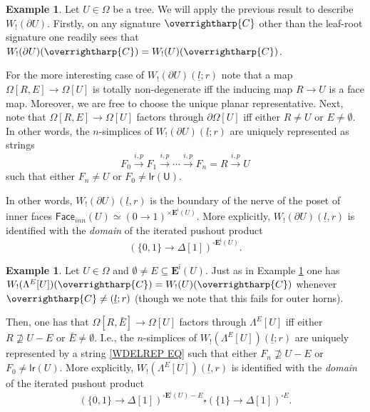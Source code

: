 \documentclass[a4paper,10pt
,draft
]{article}%
\numberwithin{equation}{section}
\numberwithin{figure}{section}
\theoremstyle{definition} %
\newtheorem{example}[equation]{Example}%
\newcommand{\vect}[1]{\text{\overrightharp{\ensuremath{#1}}}}
\newcommand{\1}{\ensuremath{\mathbbm 1}}%
\begin{document}
\begin{example}\label{WPARTIALT_EX}
	Let $U \in \Omega$ be a tree.
	We will apply the previous result to describe
	$W_!(\partial U)$.
	Firstly, 
	on any signature $\vect{C}$
	other than the leaf-root signature
	one readily sees that
	$W_!(\partial U)(\vect{C}) = W_!(U)(\vect{C})$.
	
	For the more interesting case of 
	$W_!(\partial U)(\underline{l};r)$
	note that a map
	$\Omega[R,E] \to \Omega [U]$
	is totally non-degenerate iff
	the inducing map $R \to U$
	is a face map. Moreover, we are free to choose the unique planar representative.
	Next, note that 
	$\Omega[R,E] \to \Omega [U]$
	factors through $\partial \Omega[U]$
	iff either $R \neq U$ or $E \neq \emptyset$.
	In other words, the $n$-simplices of 
	$W_!(\partial U)(\underline{l};r)$
	are uniquely represented as strings
	\begin{equation}\label{WDELREP EQ}
	F_0 \xrightarrow{i,p} 
	F_1 \xrightarrow{i,p} 
	\cdots \xrightarrow{i,p}
	F_n = R \xrightarrow{i,p} U
	\end{equation}
	such that either $F_n \neq U$ or $F_0 \neq \mathsf{lr(U)}$.
	
	In other words, 
	$W_!(\partial U)(\underline{l},r)$
	is the boundary of the nerve of the poset of inner faces
	$\mathsf{Face}_{inn}(U) \simeq 
	(0 \to 1)^{\times \boldsymbol{E}^{\mathsf{i}}(U)}$.
	More explicitly, 
	$W_!(\partial U)(\underline{l},r)$ 
	is identified with the \emph{domain} of the iterated pushout product
	\[
	\left(
	\{0,1\} \to \Delta[1]
	\right)^{\square \boldsymbol{E}^{\mathsf{i}}(U)}.
	\]
\end{example}




\begin{example}\label{WPARTIALT2_EX}
	Let $U\in \Omega$ and 
	$\emptyset \neq E \subseteq \boldsymbol{E}^{\mathsf{i}}(U)$.
	Just as in Example \ref{WPARTIALT_EX}
	one has 
	$W_!(\Lambda^E[U])(\vect{C}) = W_!(U)(\vect{C})$
	whenever $\vect{C} \neq (\underline{l};r)$
	(though we note that this fails for outer horns).
	
	Then, one has that 
	$\Omega[R,\bar{E}] \to \Omega[U]$
	factors through $\Lambda^E[U]$
	iff either $R \not \supseteq U-E$ or $\bar{E}\neq \emptyset$.
	I.e., the $n$-simplices of
	$W_!(\Lambda^E[U])(\underline{l};r)$ 
	are uniquely represented by a string
	\eqref{WDELREP EQ}
	such that either $F_n \not \supseteq U-E$
	or $F_0 \neq \mathsf{lr}(U)$. 
	More explicitly, 
	$W_!(\Lambda^E[U])(\underline{l},r)$ 
	is identified with the \emph{domain} of the iterated pushout product
	\[
	\left(
	\{0,1\} \to \Delta[1]
	\right)^{\square \boldsymbol{E}^{\mathsf{i}}(U)-E}
	\square
	\left(
	\{1\} \to \Delta[1]
	\right)^{\square E}.
	\]
\end{example}
\end{document}
